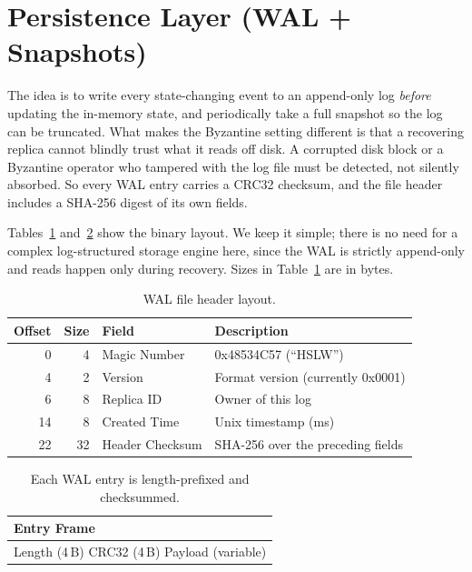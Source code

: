\section{Persistence Layer (WAL + Snapshots)}
\label{sec:persistence}

The idea is to write every state-changing event to an append-only log \emph{before} updating
the in-memory state, and periodically take a full snapshot so the log can be truncated.
What makes the Byzantine setting different is that a recovering replica cannot blindly trust
what it reads off disk.  A corrupted disk block or a Byzantine operator who tampered with
the log file must be detected, not silently absorbed.  So every WAL entry carries a CRC32
checksum, and the file header includes a SHA-256 digest of its own fields.

Tables~\ref{tab:wal-header} and~\ref{tab:wal-entry} show the binary layout.  We keep it
simple; there is no need for a complex log-structured storage engine here, since the WAL is
strictly append-only and reads happen only during recovery.  Sizes in
Table~\ref{tab:wal-header} are in bytes.

\begin{table}[t]
\centering
\setlength{\tabcolsep}{3pt}
\renewcommand{\arraystretch}{1.05}
\begin{tabular}{r r l p{4.5cm}}
\hline
\textbf{Offset} & \textbf{Size} & \textbf{Field} & \textbf{Description} \\
\hline
0  & 4  & Magic Number    & 0x48534C57 (``HSLW'') \\
4  & 2  & Version         & Format version (currently 0x0001) \\
6  & 8  & Replica ID      & Owner of this log \\
14 & 8  & Created Time    & Unix timestamp (ms) \\
22 & 32 & Header Checksum & SHA-256 over the preceding fields \\
\hline
\end{tabular}
\caption{WAL file header layout.}
\label{tab:wal-header}
\end{table}

\begin{table}[t]
\centering
\setlength{\tabcolsep}{4pt}
\renewcommand{\arraystretch}{1.1}
\begin{tabular}{|p{8cm}|}
\hline
\centering \textbf{Entry Frame} \\
\hline
Length (4\,B) \quad CRC32 (4\,B) \quad Payload (variable) \\
\hline
\end{tabular}
\caption{Each WAL entry is length-prefixed and checksummed.}
\label{tab:wal-entry}
\end{table}

